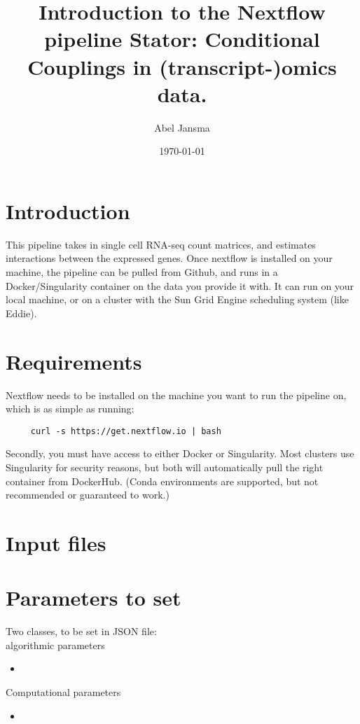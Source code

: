 \documentclass[11pt]{report}
\title{Introduction to the Nextflow pipeline \textbf{Stator}: Conditional Couplings in (transcript-)omics data.}
\author{Abel Jansma}
\date{\today}
\begin{document}
\maketitle

\section{Introduction}
This pipeline takes in single cell RNA-seq count matrices, and estimates interactions between the expressed genes. Once nextflow is installed on your machine, the pipeline can be pulled from Github, and runs in a Docker/Singularity container on the data you provide it with. It can run on your local machine, or on a cluster with the Sun Grid Engine scheduling system (like Eddie). 


\section{Requirements}
Nextflow needs to be installed on the machine you want to run the pipeline on, which is as simple as running:

\begin{verbatim}
	 curl -s https://get.nextflow.io | bash
\end{verbatim}

Secondly, you must have access to either Docker or Singularity. Most clusters use Singularity for security reasons, but both will automatically pull the right container from DockerHub. (Conda environments are supported, but not recommended or guaranteed to work.)

\section{Input files}



\section{Parameters to set}

Two classes, to be set in JSON file: \\


algorithmic parameters
\begin{itemize}
	\item 
\end{itemize}

Computational parameters
\begin{itemize}
	\item 
\end{itemize}
\end{document}
